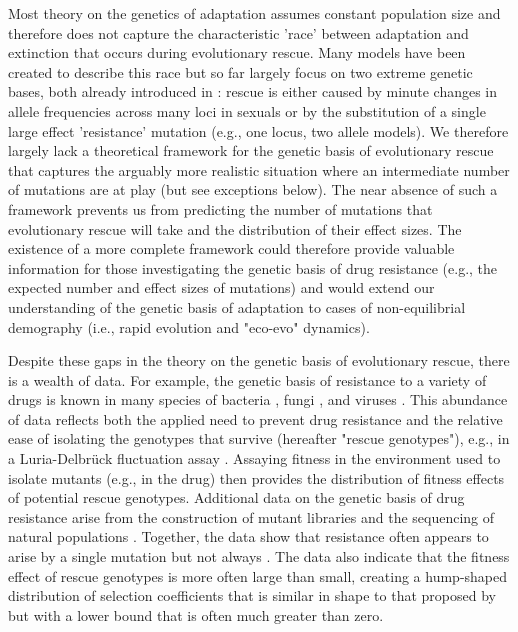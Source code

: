 \documentclass[9pt,twocolumn,twoside,lineno]{gsajnl}
\begin{document}
Most theory on the genetics of adaptation \citep[reviewed in][]{Orr2005} assumes constant population size and therefore does not capture the characteristic 'race' between adaptation and extinction that occurs during evolutionary rescue. 
Many models have been created to describe this race \citep[reviewed in][]{Alexander2014} but so far largely focus on two extreme genetic bases, both already introduced in \cite{Gomulkiewicz1995}: 
rescue is either caused by minute changes in allele frequencies across many loci in sexuals \citep[i.e., the infinitesimal model;][]{Fisher1918} or by the substitution of a single large effect 'resistance' mutation (e.g., one locus, two allele models).
We therefore largely lack a theoretical framework for the genetic basis of evolutionary rescue that captures the arguably more realistic situation where an intermediate number of mutations are at play (but see exceptions below). 
The near absence of such a framework prevents us from predicting the number of mutations that evolutionary rescue will take and the distribution of their effect sizes.
The existence of a more complete framework could therefore provide valuable information for those investigating the genetic basis of drug resistance (e.g., the expected number and effect sizes of mutations) and would extend our understanding of the genetic basis of adaptation to cases of non-equilibrial demography (i.e., rapid evolution and "eco-evo" dynamics).

Despite these gaps in the theory on the genetic basis of evolutionary rescue, there is a wealth of data.
For example, the genetic basis of resistance to a variety of drugs is known in many species of bacteria \citep[reviewed in][]{MacLean2010}, fungi \citep[reviewed in][]{Robbins2017}, and viruses \citep[reviewed in][]{Yilmaz2016}.
This abundance of data reflects both the applied need to prevent drug resistance and the relative ease of isolating the genotypes that survive (hereafter "rescue genotypes"), e.g., in a Luria-Delbr\"{u}ck fluctuation assay \citep[reviewed in][]{Bataillon2014}.
Assaying fitness in the environment used to isolate mutants (e.g., in the drug) then provides the distribution of fitness effects of potential rescue genotypes. 
Additional data on the genetic basis of drug resistance arise from the construction of mutant libraries \citep[e.g.,][]{Weinreich2006} and the sequencing of natural populations \citep[e.g.,][]{Pennings2014}.
Together, the data show that resistance often appears to arise by a single mutation \citep[e.g.,][]{MacLean2009,Lindsey2013,Gerstein2012} but not always \citep[e.g.,][]{Bataillon2011,Pennings2014,Gerstein2015,williams2019drug}.
The data also indicate that the fitness effect of rescue genotypes is more often large than small, creating a hump-shaped distribution of selection coefficients \citep[e.g.,][]{Kassen2006,MacLean2009,Gerstein2012,Lindsey2013,Gerstein2015} that is similar in shape to that proposed by \cite{Kimura1983} \citep[see][for more discussion]{Orr1998} but with a lower bound that is often much greater than zero.
\end{document}
